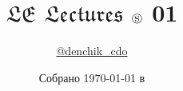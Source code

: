 \title{\huge \textbf{$\mathfrak{LE}$ $\mathfrak{Lectures}$ \quad \(\circledS\) 01}}
\author{
  \href{https://t.me/denchik_cdo}{@denchik\_cdo}
}
\date{Собрано {\ddmmyyyydate\today} в \currenttime}
\newcommand{\githublink}{https://github.com/den-swe}
